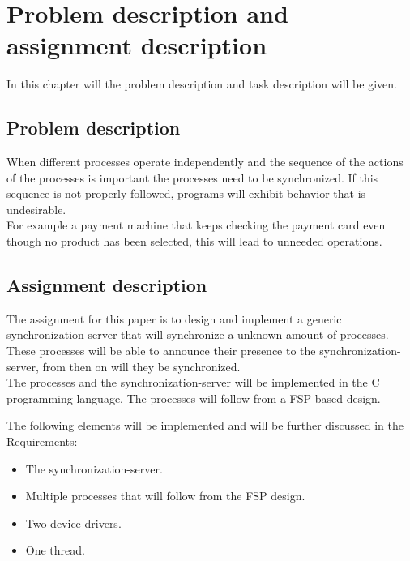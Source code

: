 \hypertarget{problem-description-and-assignment-description}{%
\chapter{Problem description and assignment
description}\label{problem-description-and-assignment-description}}

In this chapter will the problem description and task description will
be given.

\hypertarget{problem-description}{%
\section{Problem description}\label{problem-description}}

When different processes operate independently and the sequence of the
actions of the processes is important the processes need to be
synchronized. If this sequence is not properly followed, programs will
exhibit behavior that is undesirable.\\
For example a payment machine that keeps checking the payment card even
though no product has been selected, this will lead to unneeded
operations.

\hypertarget{assignment-description}{%
\section{Assignment description}\label{assignment-description}}

The assignment for this paper is to design and implement a generic
synchronization-server that will synchronize a unknown amount of
processes. These processes will be able to announce their presence to
the synchronization-server, from then on will they be synchronized.\\
The processes and the synchronization-server will be implemented in the
C programming language. The processes will follow from a FSP based
design.

The following elements will be implemented and will be further discussed
in the Requirements:

\begin{itemize}
\tightlist
\item
  The synchronization-server.
\item
  Multiple processes that will follow from the FSP design.
\item
  Two device-drivers.
\item
  One thread.
\end{itemize}
